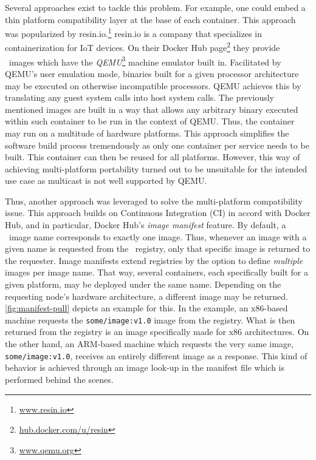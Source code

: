 Several approaches exist to tackle this problem. For example, one could embed a thin platform compatibility layer at the base of each container. This approach was popularized by resin.io.\footnote{\url{www.resin.io}} resin.io is a company that specializes in containerization for IoT devices. On their Docker Hub page\footnote{\url{hub.docker.com/u/resin}} they provide \docker\ images which have the \emph{QEMU}\footnote{\url{www.qemu.org}} machine emulator built in. Facilitated by QEMU's user emulation mode, binaries built for a given processor architecture may be executed on otherwise incompatible processors. QEMU achieves this by translating any guest system calls into host system calls. The previously mentioned images are built in a way that allows any arbitrary binary executed within such container to be run in the context of QEMU. Thus, the container may run on a multitude of hardware platforms.
This approach simplifies the software build process tremendously as only one container per service needs to be built. This container can then be reused for all platforms. However, this way of achieving multi-platform portability turned out to be unsuitable for the intended use case as multicast is not well supported by QEMU. 

Thus, another approach was leveraged to solve the multi-platform compatibility issue. This approach builds on Continuous Integration (CI) in accord with Docker Hub, and in particular, Docker Hub's \emph{image manifest} feature. By default, a \docker\ image name corresponds to exactly one image. Thus, whenever an image with a given name is requested from the \docker\ registry, only that specific image is returned to the requester. Image manifests extend registries by the option to define \emph{multiple} images per image name. That way, several containers, each specifically built for a given platform, may be deployed under the same name. Depending on the requesting node's hardware architecture, a different image may be returned. \autoref{fig:manifest-pull} depicts an example for this. In the example, an x86-based machine requests the \texttt{some/image:v1.0} image from the registry. What is then returned from the registry is an image specifically made for x86 architectures. On the other hand, an ARM-based machine which requests the very same image, \texttt{some/image:v1.0}, receives an entirely different image as a response. This kind of behavior is achieved through an image look-up in the manifest file which is performed behind the scenes. 


